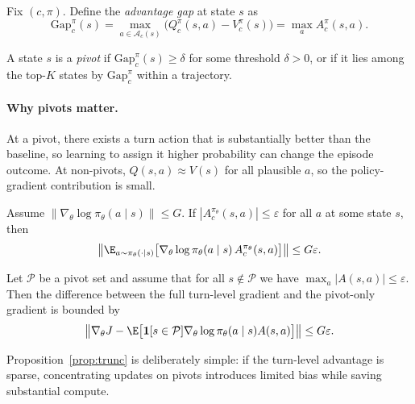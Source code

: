 \begin{definition}
\label{def:gap}
Fix $(c,\pi)$.
Define the \emph{advantage gap} at state $s$ as
\begin{equation}
\label{eq:gap}
\mathrm{Gap}_c^\pi(s)
=
\max_{a\in\mathcal{A}_c(s)}\big(Q_c^\pi(s,a)-V_c^\pi(s)\big)
=
\max_a A_c^\pi(s,a).
\end{equation}
\end{definition}

\begin{definition}
\label{def:pivot}
A state $s$ is a \emph{pivot} if $\mathrm{Gap}_c^\pi(s)\ge \delta$ for some threshold $\delta>0$, or if it lies among the top-$K$ states by $\mathrm{Gap}_c^\pi$ within a trajectory.
\end{definition}

\paragraph{Why pivots matter.}
At a pivot, there exists a turn action that is substantially better than the baseline, so learning to assign it higher probability can change the episode outcome.
At non-pivots, $Q(s,a)\approx V(s)$ for all plausible $a$, so the policy-gradient contribution is small.

\begin{proposition}
\label{prop:nonpivot_small}
Assume $\|\nabla_\theta \log \pi_\theta(a\mid s)\|\le G$.
If $|A_c^{\pi_\theta}(s,a)|\le \varepsilon$ for all $a$ at some state $s$, then
\[
\left\|
\E_{a\sim\pi_\theta(\cdot\mid s)}
\big[\nabla_\theta \log \pi_\theta(a\mid s)\,A_c^{\pi_\theta}(s,a)\big]
\right\|
\le
G\varepsilon.
\]
\end{proposition}

\begin{proposition}
\label{prop:trunc}
Let $\mathcal{P}$ be a pivot set and assume that for all $s\notin\mathcal{P}$ we have
$\max_a |A(s,a)|\le \varepsilon$.
Then the difference between the full turn-level gradient and the pivot-only gradient is bounded by
\[
\left\|\nabla_\theta J - \E\big[\mathbf{1}[s\in\mathcal{P}]\nabla_\theta\log\pi_\theta(a\mid s)A(s,a)\big]\right\|
\le
G\varepsilon.
\]
\end{proposition}

Proposition~\ref{prop:trunc} is deliberately simple:
if the turn-level advantage is sparse, concentrating updates on pivots introduces limited bias while saving substantial compute.



